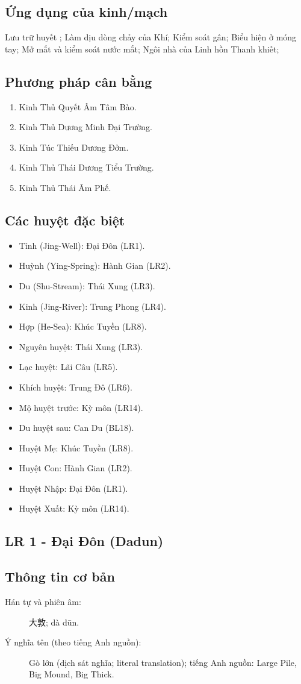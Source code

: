 \documentclass[12pt,a4paper]{article}
\begin{document}
\subsection*{Ứng dụng của kinh/mạch}Lưu trữ huyết ; Làm dịu dòng chảy của Khí; Kiểm soát gân; Biểu hiện ở móng tay; Mở mắt và kiểm soát nước mắt; Ngôi nhà của Linh hồn Thanh khiết;
\subsection*{Phương pháp cân bằng}
\begin{enumerate}
\item Kinh Thủ Quyết Âm Tâm Bào.
\item Kinh Thủ Dương Minh Đại Trường.
\item Kinh Túc Thiếu Dương Đởm.
\item Kinh Thủ Thái Dương Tiểu Trường.
\item Kinh Thủ Thái Âm Phế.
\end{enumerate}
\subsection*{Các huyệt đặc biệt}
\begin{itemize}
\item Tỉnh (Jing-Well): Đại Đôn (LR1).
\item Huỳnh (Ying-Spring): Hành Gian (LR2).
\item Du (Shu-Stream): Thái Xung (LR3).
\item Kinh (Jing-River): Trung Phong (LR4).
\item Hợp (He-Sea): Khúc Tuyền (LR8).
\item Nguyên huyệt: Thái Xung (LR3).
\item Lạc huyệt: Lãi Câu (LR5).
\item Khích huyệt: Trung Đô (LR6).
\item Mộ huyệt trước: Kỳ môn (LR14).
\item Du huyệt sau: Can Du (BL18).
\item Huyệt Mẹ: Khúc Tuyền (LR8).
\item Huyệt Con: Hành Gian (LR2).
\item Huyệt Nhập: Đại Đôn (LR1).
\item Huyệt Xuất: Kỳ môn (LR14).
\end{itemize}
\subsection{LR 1 - Đại Đôn (Dadun)}
\subsection*{Thông tin cơ bản}\begin{description}\item[Hán tự và phiên âm:] 大敦; dà dūn.\item[Ý nghĩa tên (theo tiếng Anh nguồn):] Gò lớn (dịch sát nghĩa; literal translation); tiếng Anh nguồn: Large Pile, Big Mound, Big Thick.\end{description}
\end{document}
